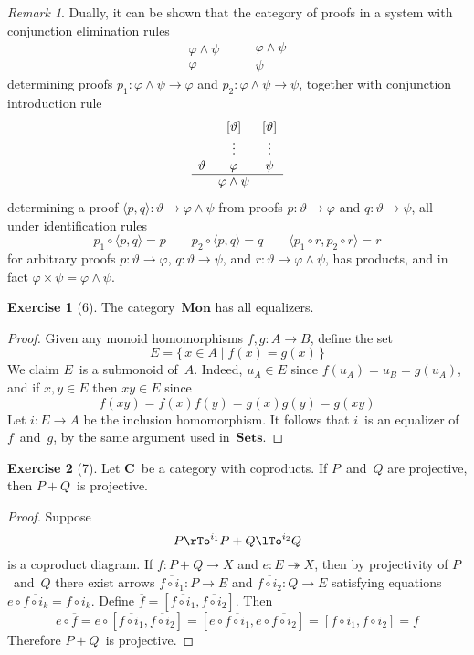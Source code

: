 \documentclass[letterpaper,12pt]{article}
\newcommand{\epi}{\twoheadrightarrow}
\newcommand{\after}{\circ}
\newcommand{\pair}[2]{\langle{#1},{#2}\rangle}
\newcommand{\copair}[2]{[{#1},{#2}]}
\newcommand{\cat}[1]{\mathbf{#1}}
\newcommand{\C}{\cat{C}}
\newcommand{\Sets}{\cat{Sets}}
\newcommand{\Mon}{\cat{Mon}}
\theoremstyle{definition}
\newtheorem*{exer}{Exercise}
\theoremstyle{remark}
\newtheorem*{rmk}{Remark}
\theoremstyle{direction}
\begin{document}
\begin{rmk}
Dually, it can be shown that the category of proofs in a system with conjunction elimination rules
\[\begin{array}{c}
\varphi\land\psi\\
\hline
\varphi
\end{array}
\qquad
\begin{array}{c}
\varphi\land\psi\\
\hline
\psi
\end{array}\]
determining proofs \(p_1:\varphi\land\psi\to\varphi\) and \(p_2:\varphi\land\psi\to\psi\), together with conjunction introduction rule
\[\begin{array}{ccc}
&[\vartheta]&[\vartheta]\\
&\vdots&\vdots\\
\vartheta&\varphi&\psi\\
\hline
&\varphi\land\psi&
\end{array}\]
determining a proof \(\pair{p}{q}:\vartheta\to\varphi\land\psi\) from proofs \(p:\vartheta\to\varphi\) and \(q:\vartheta\to\psi\), all under identification rules
\[p_1\after\pair{p}{q}=p\qquad p_2\after\pair{p}{q}=q\qquad\pair{p_1\after r}{p_2\after r}=r\]
for arbitrary proofs \(p:\vartheta\to\varphi\), \(q:\vartheta\to\psi\), and \(r:\vartheta\to\varphi\land\psi\), has products, and in fact \(\varphi\times\psi=\varphi\land\psi\).
\end{rmk}

\begin{exer}[6]
The category~\(\Mon\) has all equalizers.
\end{exer}
\begin{proof}
Given any monoid homomorphisms \(f,g:A\to B\), define the set
\[E=\{\,x\in A\mid f(x)=g(x)\,\}\]
We claim \(E\)~is a submonoid of~\(A\). Indeed, \(u_A\in E\) since \(f(u_A)=u_B=g(u_A)\), and if \(x,y\in E\) then \(xy\in E\) since
\[f(xy)=f(x)f(y)=g(x)g(y)=g(xy)\]
Let \(i:E\to A\) be the inclusion homomorphism. It follows that \(i\)~is an equalizer of \(f\)~and~\(g\), by the same argument used in~\(\Sets\).
\end{proof}

\begin{exer}[7]
Let \(\C\)~be a category with coproducts. If \(P\)~and~\(Q\) are projective, then \(P+Q\)~is projective.
\end{exer}
\begin{proof}
Suppose
\[P\rTo^{i_1}P+Q\lTo^{i_2}Q\]
is a coproduct diagram. If \(f:P+Q\to X\) and \(e:E\epi X\), then by projectivity of \(P\)~and~\(Q\) there exist arrows \(\overline{f\after i_1}:P\to E\) and \(\overline{f\after i_2}:Q\to E\) satisfying equations \(e\after\overline{f\after i_k}=f\after i_k\). Define \(\overline{f}=\copair{\overline{f\after i_1}}{\overline{f\after i_2}}\). Then
\[e\after\overline{f}
=e\after\copair{\overline{f\after i_1}}{\overline{f\after i_2}}
=\copair{e\after\overline{f\after i_1}}{e\after\overline{f\after i_2}}
=\copair{f\after i_1}{f\after i_2}
=f\]
Therefore \(P+Q\)~is projective.
\end{proof}
\end{document}
